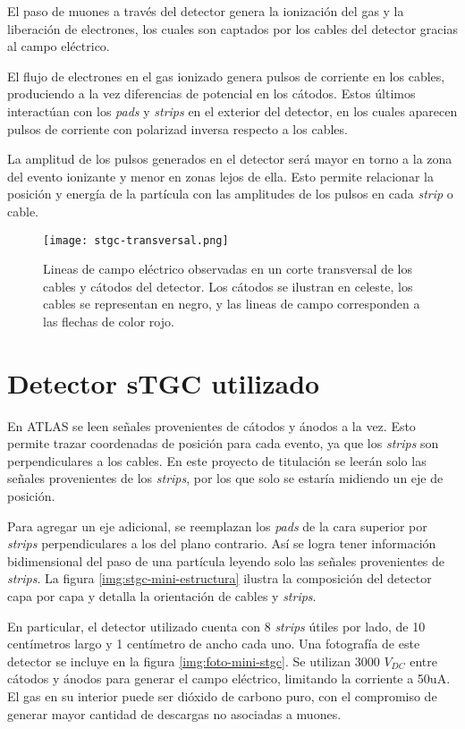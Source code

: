 	El paso de muones a través del detector genera la ionización del gas y la liberación de electrones, los cuales son captados por los cables del detector gracias al campo eléctrico.
	
	El flujo de electrones en el gas ionizado genera pulsos de corriente en los cables, produciendo a la vez diferencias de potencial en los cátodos. Estos últimos interactúan con los \textit{pads} y \textit{strips} en el exterior del detector, en los cuales aparecen pulsos de corriente con polarizad inversa respecto a los cables.
	
	La amplitud de los pulsos generados en el detector será mayor en torno a la zona del evento ionizante y menor en zonas lejos de ella. Esto permite relacionar la posición y energía de la partícula con las amplitudes de los pulsos en cada \textit{strip} o cable.
	
	\begin{figure}[h]
		\centering
		\texttt{[image: stgc-transversal.png]}
		\caption{Lineas de campo eléctrico observadas en un corte transversal de los cables y cátodos del detector. Los cátodos se ilustran en celeste, los cables se representan en negro, y las lineas de campo corresponden a las flechas de color rojo\cite{GEMTracker}.}
		\label{img:stgc-field}
	\end{figure}

\newpage
\section{Detector sTGC utilizado}
	En ATLAS se leen señales provenientes de cátodos y ánodos a la vez. Esto permite trazar coordenadas de posición para cada evento, ya que los \textit{strips} son perpendiculares a los cables. En este proyecto de titulación se leerán solo las señales provenientes de los \textit{strips}, por los que solo se estaría midiendo un eje de posición. 
	
	Para agregar un eje adicional, se reemplazan los \textit{pads} de la cara superior por \textit{strips} perpendiculares a los del plano contrario. Así se logra tener información bidimensional del paso de una partícula leyendo solo las señales provenientes de \textit{strips}. La figura \ref{img:stgc-mini-estructura} ilustra la composición del detector capa por capa y detalla la orientación de cables y \textit{strips}.
	
	En particular, el detector utilizado cuenta con 8 \textit{strips} útiles por lado, de 10 centímetros largo y 1 centímetro de ancho cada uno. Una fotografía de este detector se incluye en la figura \ref{img:foto-mini-stgc}. Se utilizan 3000 $V_{DC}$ entre cátodos y ánodos para generar el campo eléctrico, limitando la corriente a 50uA. El gas en su interior puede ser dióxido de carbono puro, con el compromiso de generar mayor cantidad de descargas no asociadas a muones.
	
